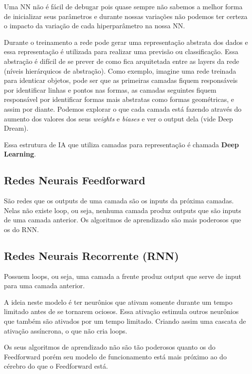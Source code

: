 \documentclass[11pt,a4paper,leqno]{article}
\begin{document}
Uma NN não é fácil de debugar pois quase sempre não sabemos a melhor forma de inicializar seus parâmetros e durante nossas variações não podemos ter certeza o impacto da variação de cada hiperparâmetro na nossa NN.


Durante o treinamento a rede pode gerar uma representação abstrata dos dados e essa representação é utilizada para realizar uma previsão ou classificação. Essa abstração é difícil de se prever de como fica arquitetada entre as layers da rede (níveis hierárquicos de abstração). Como exemplo, imagine uma rede treinada para identicar objetos, pode ser que as primeiras camadas fiquem responsáveis por identificar linhas e pontos nas formas, as camadas seguintes fiquem responsável por identificar formas mais abstratas como formas geométricas, e assim por diante. \linebreak
Podemos explorar o que cada camada está fazendo através do aumento dos valores dos seus \emph{weights} e \emph{biases} e ver o output dela (vide Deep Dream).

Essa estrutura de IA que utiliza camadas para representação é chamada \textbf{Deep Learning}.



\subsection{Redes Neurais Feedforward}
São redes que os outputs de uma camada são os inputs da próxima camadas.
Nelas não existe loop, ou seja, nenhuma camada produz outputs que são inputs de uma camada anterior.
Os algoritmos de aprendizado são mais poderosos que os do RNN.




\subsection{Redes Neurais Recorrente (RNN)}
Possuem loops, ou seja, uma camada a frente produz output que serve de input para uma camada anterior.

A ideia neste modelo é ter neurônios que ativam somente durante um tempo limitado antes de se tornarem ociosos. Essa ativação estimula outros neurônios que também são ativados por um tempo limitado. Criando assim uma cascata de ativação assíncrona, o que não cria loops.

Os seus algoritmos de aprendizado não são tão poderosos quanto os do Feedforward porém seu modelo de funcionamento está mais próximo ao do cérebro do que o Feedforward está.
\end{document}
